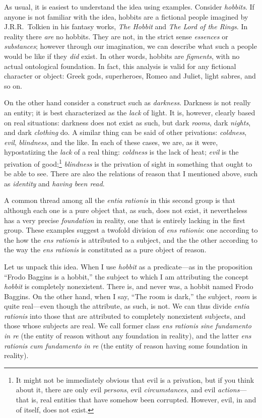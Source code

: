 \documentclass[
  12pt,
]{memoir}
\begin{document}
As usual, it is easiest to understand the idea using examples. Consider
\emph{hobbits}. If anyone is not familiar with the idea, hobbits are a
fictional people imagined by J.R.R.~Tolkien in his fantasy works,
\emph{The Hobbit} and \emph{The Lord of the Rings}. In reality there
\emph{are} no hobbits. They are not, in the strict sense \emph{essences}
or \emph{substances}; however through our imagination, we can describe
what such a people would be like if they \emph{did} exist. In other
words, hobbits are \emph{figments}, with no actual ontological
foundation. In fact, this analysis is valid for any fictional character
or object: Greek gods, superheroes, Romeo and Juliet, light sabres, and
so on.

On the other hand consider a construct such as \emph{darkness}. Darkness
is not really an entity; it is best characterized as the \emph{lack} of
light. It is, however, clearly based on real situations: darkness does
not exist as such, but dark \emph{rooms}, dark \emph{nights}, and dark
\emph{clothing} do. A similar thing can be said of other privations:
\emph{coldness}, \emph{evil}, \emph{blindness}, and the like. In each of
these cases, we are, as it were, hypostatizing the \emph{lack} of a real
thing: \emph{coldness} is the lack of heat; \emph{evil} is the privation
of good;\footnote{It might not be immediately obvious that evil is a
  privation, but if you think about it, there are only evil
  \emph{persons}, evil \emph{circumstances}, and evil
  \emph{actions}---that is, real entities that have somehow been
  corrupted. However, evil, in and of itself, does not exist.}
\emph{blindness} is the privation of sight in something that ought to be
able to see. There are also the relations of reason that I mentioned
above, such as \emph{identity} and \emph{having been read}.

A common thread among all the \emph{entia rationis} in this second group
is that although each one is a pure object that, as such, does not
exist, it nevertheless has a very precise \emph{foundation} in reality,
one that is entirely lacking in the first group. These examples suggest
a twofold division of \emph{ens rationis}: one according to the how the
\emph{ens rationis} is attributed to a subject, and the the other
according to the way the \emph{ens rationis} is constituted as a pure
object of reason.

Let us unpack this idea. When I use \emph{hobbit} as a predicate---as in
the proposition ``Frodo Baggins is a hobbit,'' the subject to which I am
attributing the concept \emph{hobbit} is completely nonexistent. There
is, and never was, a hobbit named Frodo Baggins. On the other hand, when
I say, ``The room is dark,'' the subject, \emph{room} is quite
real---even though the attribute, as such, is not. We can thus divide
\emph{entia rationis} into those that are attributed to completely
nonexistent subjects, and those whose subjects are real. We call former
class \emph{ens rationis sine fundamento in re} (the entity of reason
without any foundation in reality), and the latter \emph{ens rationis
cum fundamento in re} (the entity of reason having some foundation in
reality).
\end{document}
